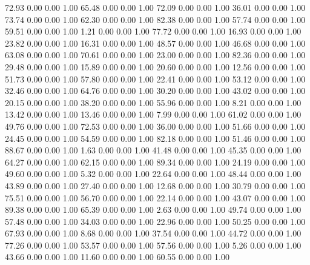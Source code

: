    72.93   0.00   0.00   1.00
   65.48   0.00   0.00   1.00
   72.09   0.00   0.00   1.00
   36.01   0.00   0.00   1.00
   73.74   0.00   0.00   1.00
   62.30   0.00   0.00   1.00
   82.38   0.00   0.00   1.00
   57.74   0.00   0.00   1.00
   59.51   0.00   0.00   1.00
    1.21   0.00   0.00   1.00
   77.72   0.00   0.00   1.00
   16.93   0.00   0.00   1.00
   23.82   0.00   0.00   1.00
   16.31   0.00   0.00   1.00
   48.57   0.00   0.00   1.00
   46.68   0.00   0.00   1.00
   63.08   0.00   0.00   1.00
   70.61   0.00   0.00   1.00
   23.00   0.00   0.00   1.00
   82.36   0.00   0.00   1.00
   29.48   0.00   0.00   1.00
   15.89   0.00   0.00   1.00
   20.60   0.00   0.00   1.00
   12.56   0.00   0.00   1.00
   51.73   0.00   0.00   1.00
   57.80   0.00   0.00   1.00
   22.41   0.00   0.00   1.00
   53.12   0.00   0.00   1.00
   32.46   0.00   0.00   1.00
   64.76   0.00   0.00   1.00
   30.20   0.00   0.00   1.00
   43.02   0.00   0.00   1.00
   20.15   0.00   0.00   1.00
   38.20   0.00   0.00   1.00
   55.96   0.00   0.00   1.00
    8.21   0.00   0.00   1.00
   13.42   0.00   0.00   1.00
   13.46   0.00   0.00   1.00
    7.99   0.00   0.00   1.00
   61.02   0.00   0.00   1.00
   49.76   0.00   0.00   1.00
   72.53   0.00   0.00   1.00
   36.00   0.00   0.00   1.00
   51.66   0.00   0.00   1.00
   24.45   0.00   0.00   1.00
   54.59   0.00   0.00   1.00
   82.18   0.00   0.00   1.00
   51.46   0.00   0.00   1.00
   88.67   0.00   0.00   1.00
    1.63   0.00   0.00   1.00
   41.48   0.00   0.00   1.00
   45.35   0.00   0.00   1.00
   64.27   0.00   0.00   1.00
   62.15   0.00   0.00   1.00
   89.34   0.00   0.00   1.00
   24.19   0.00   0.00   1.00
   49.60   0.00   0.00   1.00
    5.32   0.00   0.00   1.00
   22.64   0.00   0.00   1.00
   48.44   0.00   0.00   1.00
   43.89   0.00   0.00   1.00
   27.40   0.00   0.00   1.00
   12.68   0.00   0.00   1.00
   30.79   0.00   0.00   1.00
   75.51   0.00   0.00   1.00
   56.70   0.00   0.00   1.00
   22.14   0.00   0.00   1.00
   43.07   0.00   0.00   1.00
   89.38   0.00   0.00   1.00
   65.39   0.00   0.00   1.00
    2.63   0.00   0.00   1.00
   49.74   0.00   0.00   1.00
   57.48   0.00   0.00   1.00
   34.03   0.00   0.00   1.00
   22.96   0.00   0.00   1.00
   50.25   0.00   0.00   1.00
   67.93   0.00   0.00   1.00
    8.68   0.00   0.00   1.00
   37.54   0.00   0.00   1.00
   44.72   0.00   0.00   1.00
   77.26   0.00   0.00   1.00
   53.57   0.00   0.00   1.00
   57.56   0.00   0.00   1.00
    5.26   0.00   0.00   1.00
   43.66   0.00   0.00   1.00
   11.60   0.00   0.00   1.00
   60.55   0.00   0.00   1.00
